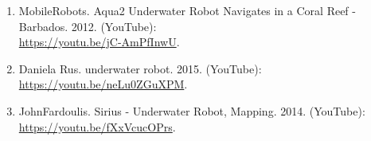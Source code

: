 \documentclass[10pt,twocolumn,letterpaper]{article}
\begin{document}
{\begin{enumerate}
    \item MobileRobots. Aqua2 Underwater Robot Navigates in a Coral Reef - Barbados. 2012. (YouTube): \\
    \url{https://youtu.be/jC-AmPfInwU}.
    
    \item Daniela Rus. underwater robot. 2015. (YouTube): \\
    \url{https://youtu.be/neLu0ZGuXPM}.
    
    \item JohnFardoulis. Sirius - Underwater Robot, Mapping. 2014. (YouTube): 
    \url{https://youtu.be/fXxVcucOPrs}.
    

\end{enumerate}

}


 
\end{document}
